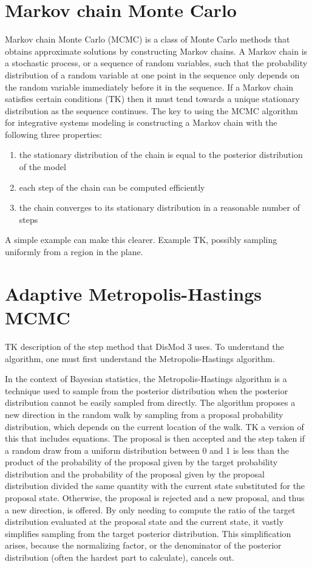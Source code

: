 \section{Markov chain Monte Carlo}
Markov chain Monte Carlo (MCMC) is a class of Monte Carlo methods that
obtains approximate solutions by constructing Markov chains. A Markov
chain is a stochastic process, or a sequence of random variables, such
that the probability distribution of a random variable at one point in
the sequence only depends on the random variable immediately before it
in the sequence. If a Markov chain satisfies certain conditions (TK)
then it must tend towards a unique stationary distribution as the
sequence continues. The key to using the MCMC algorithm for
integrative systems modeling is constructing a Markov chain with the
following three properties:
\begin{enumerate}
\item the stationary distribution of the chain is equal to the
  posterior distribution of the model
\item each step of the chain can be computed efficiently
\item the chain converges to its stationary distribution in a
  reasonable number of steps
\end{enumerate}

A simple example can make this clearer. Example TK, possibly sampling
uniformly from a region in the plane.

\section{Adaptive Metropolis-Hastings MCMC}
TK description of the step method that DisMod 3 uses. To understand
the algorithm, one must first understand the Metropolis-Hastings
algorithm.

In the context of Bayesian statistics, the Metropolis-Hastings
algorithm is a technique used to sample from the posterior
distribution when the posterior distribution cannot be easily sampled
from directly. The algorithm proposes a new direction in the random
walk by sampling from a proposal probability distribution, which
depends on the current location of the walk. TK a version of this that
includes equations.  The proposal is then accepted and the step taken
if a random draw from a uniform distribution between 0 and 1 is less
than the product of the probability of the proposal given by the
target probability distribution and the probability of the proposal
given by the proposal distribution divided the same quantity with the
current state substituted for the proposal state. Otherwise, the
proposal is rejected and a new proposal, and thus a new direction, is
offered. By only needing to compute the ratio of the target
distribution evaluated at the proposal state and the current state, it
vastly simplifies sampling from the target posterior
distribution. This simplification arises, because the normalizing
factor, or the denominator of the posterior distribution (often the
hardest part to calculate), cancels out.

